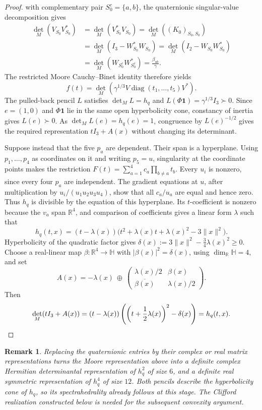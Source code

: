 \documentclass[11pt,onecolumn]{article}
\theoremstyle{blueplain}
\theoremstyle{bluedefinition}
\theoremstyle{bluedefinition}
\newtheorem{remark}[remark]{Remark}
\begin{document}
\begin{proof}
with complementary pair $S_0^c=\{a,b\}$, the quaternionic singular-value
decomposition gives
\[
 \begin{aligned}
 \det_M(V_{S_0}V_{S_0}^*)
 &=\det_M(V_{S_0}^*V_{S_0})
  =\det_M((K_0)_{S_0,S_0})\\
 &=\det_M(I_3-W_{S_0}^*W_{S_0})
  =\det_M(I_2-W_{S_0}W_{S_0}^*)\\
 &=\det_M(W_{S_0^c}W_{S_0^c}^*)
  =\frac{\beta_{ab}}\gamma.
 \end{aligned}
\]
The restricted Moore Cauchy--Binet identity
\cite[expanded version, Proposition~A.3(g)]{ScottSokal} therefore yields
\[
 f(t)=\det_M\left(
 \gamma^{1/3}V\operatorname{diag}(t_1,\ldots,t_5)V^*\right).
\]
The pulled-back pencil $L$ satisfies $\det_M L=h_q$ and
$L(\Phi\mathbf1)=\gamma^{1/3}I_3\succ0$.  Since $e=(1,0)$ and
$\Phi\mathbf1$ lie in the same open hyperbolicity cone, constancy of
inertia gives $L(e)\succ0$.  As $\det_M L(e)=h_q(e)=1$, congruence by
$L(e)^{-1/2}$ gives the required representation $tI_3+A(x)$ without
changing its determinant.

Suppose instead that the five $p_a$ are dependent.  Their span is a
hyperplane.  Using $p_1,\ldots,p_4$ as coordinates on it and writing
$p_5=u$, singularity at the coordinate points makes the restriction
$F(t)=\sum_{a=1}^4c_a\prod_{b\ne a}t_b$.
Every $u_i$ is nonzero, since every four $p_a$ are independent.
The gradient equations at $u$, after multiplication by
$u_i/(u_1u_2u_3u_4)$, show that all $c_a/u_a$ are equal and hence zero.
Thus
$h_q$ is divisible by the equation of this hyperplane.  Its $t$-coefficient
is nonzero because the $v_a$ span $\mathbb R^4$, and comparison of
coefficients gives a linear form $\lambda$ such that
\[
 h_q(t,x)=(t-\lambda(x))
 \bigl(t^2+\lambda(x)t+\lambda(x)^2-3\|x\|^2\bigr).
\]
Hyperbolicity of the quadratic factor gives
$\delta(x):=3\|x\|^2-\frac34\lambda(x)^2\geqslant0$.
Choose a real-linear map
$\beta\colon\mathbb R^4\to\mathbb H$ with
$|\beta(x)|^2=\delta(x)$, using $\dim_{\mathbb R}\mathbb H=4$, and set
\[
 A(x)=-\lambda(x)\ \oplus\
 \begin{pmatrix}
  \lambda(x)/2&\beta(x)\\
  \overline{\beta(x)}&\lambda(x)/2
 \end{pmatrix}.
\]
Then
\[
 \det_M(tI_3+A(x))
 =(t-\lambda(x))
 \left(\left(t+\frac12\lambda(x)\right)^2-\delta(x)\right)
 =h_q(t,x).\qedhere
\]
\end{proof}

\begin{remark}
Replacing the quaternionic entries by their complex or real matrix
representations turns the Moore representation above into a definite
complex Hermitian determinantal
representation of $h_q^2$ of size $6$, and a definite real symmetric
representation of $h_q^4$ of size $12$.
Both pencils describe the hyperbolicity cone of $h_q$, so its
spectrahedrality already follows at this stage.  The Clifford realization
constructed below is needed for the subsequent convexity argument.
\end{remark}
\end{document}
